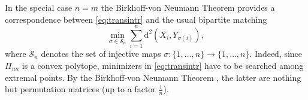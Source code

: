 \documentclass[11pt,a4paper,oneside]{amsart}
\numberwithin{equation}{section}
\newcommand{\dd}{\mathrm{d}}
\begin{document}
\medskip
In the special case $n=m$ the Birkhoff-von Neumann  Theorem provides a correspondence between \eqref{eq:transintr} and the usual bipartite matching
\begin{equation}\label{eq:minweightgraph}
%
\min_{\sigma\in \mathcal{S}_{n}} \sum_{i=1}^n \mathrm{d}^2(X_i,Y_{\sigma(i)}),
%
\end{equation}
%
where $\mathcal{S}_{n}$ denotes the set of injective maps $\sigma: \{1, \dots, n\} \rightarrow \{1, \dots, n\}$. 
%
Indeed, since $\Pi_{nn}$ is a convex polytope, minimizers in \eqref{eq:transintr} have to be searched among extremal points. By the Birkhoff-von Neumann Theorem \cite[Lemma 2.1.3]{bapat}, the latter are nothing but permutation matrices (up to a factor $\tfrac{1}{n}$). 

%
%
%
%
%

%
\medskip
%

%
%
%
%
\end{document}
